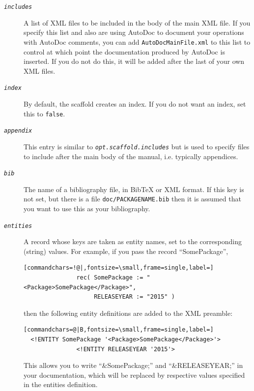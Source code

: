 \documentclass[a4paper,11pt]{report}
\begin{document}
{{{\begin{description}
\begin{description}
 
\begin{description}
\item[{\mbox{\texttt{\mdseries\slshape includes}}}]  A list of XML files to be included in the body of the main XML file. If you
specify this list and also are using \textsf{AutoDoc} to document your operations with \textsf{AutoDoc} comments, you can add \texttt{{\textunderscore}AutoDocMainFile.xml} to this list to control at which point the documentation produced by \textsf{AutoDoc} is inserted. If you do not do this, it will be added after the last of your
own XML files. 
\item[{\mbox{\texttt{\mdseries\slshape index}}}]  By default, the scaffold creates an index. If you do not want an index, set
this to \texttt{false}. 
\item[{\mbox{\texttt{\mdseries\slshape appendix}}}]  This entry is similar to \mbox{\texttt{\mdseries\slshape opt.scaffold.includes}} but is used to specify files to include after the main body of the manual,
i.e. typically appendices. 
\item[{\mbox{\texttt{\mdseries\slshape bib}}}]  The name of a bibliography file, in BibTeX or XML format. If this key is not
set, but there is a file \texttt{doc/PACKAGENAME.bib} then it is assumed that you want to use this as your bibliography. 
\item[{\mbox{\texttt{\mdseries\slshape entities}}}]  A record whose keys are taken as entity names, set to the corresponding
(string) values. For example, if you pass the record ``SomePackage'', 
\begin{Verbatim}[commandchars=!@|,fontsize=\small,frame=single,label=]
               rec( SomePackage := "<Package>SomePackage</Package>",
                    RELEASEYEAR := "2015" )
\end{Verbatim}
 then the following entity definitions are added to the XML preamble: 
\begin{Verbatim}[commandchars=@|B,fontsize=\small,frame=single,label=]
  <!ENTITY SomePackage '<Package>SomePackage</Package>'>
               <!ENTITY RELEASEYEAR '2015'>
\end{Verbatim}
 This allows you to write ``\&SomePackage;'' and ``\&RELEASEYEAR;'' in your documentation, which will be replaced by respective values specified
in the entities definition. 


\end{description}
\end{description}
\end{description}}}}
\end{document}
